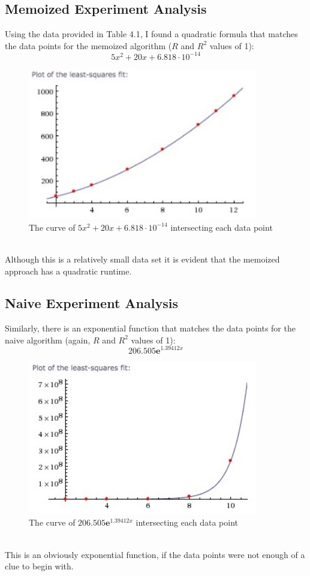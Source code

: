 \documentclass[paper=a4, fontsize=11pt]{scrartcl} %
\numberwithin{equation}{section} %
\numberwithin{figure}{section} %
\numberwithin{table}{section} %
\begin{document}
\subsection{Memoized Experiment Analysis}
Using the data provided in Table 4.1, I found a quadratic formula that matches the data points for the memoized algorithm ($R$ and $R^2$ values of 1): 
\[
	5x^2 + 20x + 6.818 \cdot 10^{-14}
\]
\begin{figure}[ht!]
\centering
\includegraphics[width=100mm]{Figure_3.jpg}
\caption{The curve of $5x^2 + 20x + 6.818 \cdot 10^{-14}$ intersecting each data point}
\label{overflow}
\end{figure}\\
Although this is a relatively small data set it is evident that the memoized approach has a quadratic runtime.

\subsection{Naive Experiment Analysis}
Similarly, there is an exponential function that matches the data points for the naive algorithm (again, $R$ and $R^2$ values of 1):
\[
	206.505\mathbf{e}^{1.39412x}
\]
\begin{figure}[h]
\centering
\includegraphics[width=100mm]{Figure_4.jpg}
\caption{The curve of $206.505\mathbf{e}^{1.39412x}$ intersecting each data point}
\label{overflow}
\end{figure} \\
This is an obviously exponential function, if the data points were not enough of a clue to begin with.
\end{document}
